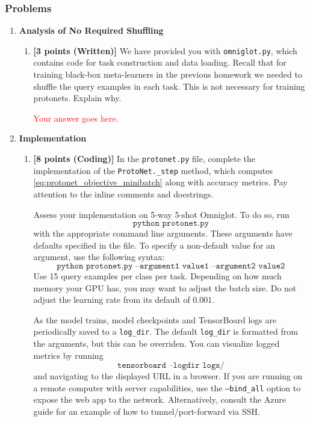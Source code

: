 \documentclass[12pt]{article}
\begin{document}
\subsubsection*{Problems}


\begin{enumerate}
    \item \textbf{Analysis of No Required Shuffling}
    \begin{enumerate}[label=(\alph*)]
        \item\textbf{[3 points (Written)]} We have provided you with \texttt{omniglot.py}, which contains code for task construction and data loading. Recall that for training black-box meta-learners in the previous homework we needed to shuffle the query examples in each task. This is not necessary for training protonets. Explain why.
        
        \textcolor{red}{Your answer goes here.}
        
    \end{enumerate}
    
    \newpage
    \item \textbf{Implementation}
    \begin{enumerate}[label=(\alph*)]
    \item \textbf{[8 points (Coding)]} 
    In the \texttt{protonet.py} file, complete the implementation of the \texttt{ProtoNet.\_step} method, which computes \eqref{eq:protonet_objective_minibatch} along with accuracy metrics. Pay attention to the inline comments and docstrings.
    
    Assess your implementation on 5-way 5-shot Omniglot. To do so, run 
    \begin{equation*} 
        \texttt{python protonet.py} 
    \end{equation*}
    with the appropriate command line arguments. These arguments have defaults specified in the file. To specify a non-default value for an argument, use the following syntax:
    \begin{equation*}
        \texttt{python protonet.py --argument1 value1 --argument2 value2}
    \end{equation*}
    Use 15 query examples per class per task. Depending on how much memory your GPU has, you may want to adjust the batch size. Do not adjust the learning rate from its default of $0.001$.
    
     As the model trains, model checkpoints and TensorBoard logs are periodically saved to a \texttt{log\_dir}. The default \texttt{log\_dir} is formatted from the arguments, but this can be overriden. You can visualize logged metrics by running
    \begin{equation*}
        \texttt{tensorboard --logdir logs/}
    \end{equation*}
    and navigating to the displayed URL in a browser. If you are running on a remote computer with server capabilities, use the \texttt{--bind\_all} option to expose the web app to the network. Alternatively, consult the Azure guide for an example of how to tunnel/port-forward via SSH.
    

\end{enumerate}
\end{enumerate}
\end{document}
